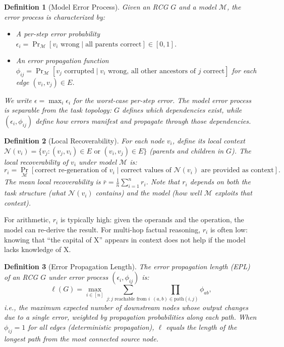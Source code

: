 \documentclass{article}
\newtheorem{definition}{Definition}
\begin{document}
\begin{definition}[Model Error Process]
\label{def:error_process}
Given an RCG $G$ and a model $\mathcal{M}$, the \emph{error process} is characterized by:
\begin{itemize}[nosep]
\item A per-step error probability $\epsilon_i = \Pr_{\mathcal{M}}[v_i \text{ wrong} \mid \text{all parents correct}] \in [0,1]$.
\item An error propagation function $\phi_{ij} = \Pr_{\mathcal{M}}[v_j \text{ corrupted} \mid v_i \text{ wrong, all other ancestors of } j \text{ correct}]$ for each edge $(v_i, v_j) \in E$.
\end{itemize}
We write $\epsilon = \max_i \epsilon_i$ for the worst-case per-step error. The model error process is \emph{separable} from the task topology: $G$ defines which dependencies exist, while $(\epsilon_i, \phi_{ij})$ define how errors manifest and propagate through those dependencies.
\end{definition}

\begin{definition}[Local Recoverability]
\label{def:recoverability}
For each node $v_i$, define its \emph{local context} $\mathcal{N}(v_i) = \{v_j : (v_j, v_i) \in E \text{ or } (v_i, v_j) \in E\}$ (parents and children in $G$). The \emph{local recoverability} of $v_i$ under model $\mathcal{M}$ is:
\begin{equation}
r_i = \Pr_{\mathcal{M}}\!\left[\text{correct re-generation of } v_i \mid \text{correct values of } \mathcal{N}(v_i) \text{ are provided as context}\right].
\end{equation}
The \emph{mean local recoverability} is $\bar{r} = \frac{1}{n}\sum_{i=1}^n r_i$. Note that $r_i$ depends on both the task structure (what $\mathcal{N}(v_i)$ contains) and the model (how well $\mathcal{M}$ exploits that context).
\end{definition}

For arithmetic, $r_i$ is typically high: given the operands and the operation, the model can re-derive the result. For multi-hop factual reasoning, $r_i$ is often low: knowing that ``the capital of X'' appears in context does not help if the model lacks knowledge of X.

\begin{definition}[Error Propagation Length]
\label{def:epl}
The \emph{error propagation length} (EPL) of an RCG $G$ under error process $(\epsilon_i, \phi_{ij})$ is:
\begin{equation}
\ell(G) = \max_{i \in [n]} \sum_{j : j \text{ reachable from } i} \prod_{(a,b) \in \text{path}(i,j)} \phi_{ab},
\end{equation}
i.e., the maximum expected number of downstream nodes whose output changes due to a single error, weighted by propagation probabilities along each path. When $\phi_{ij} = 1$ for all edges (deterministic propagation), $\ell$ equals the length of the longest path from the most connected source node.
\end{definition}
\end{document}
